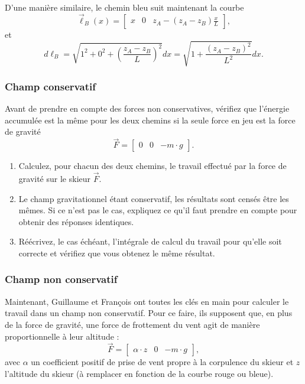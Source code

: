 \documentclass{cup-pan}
\begin{document}
D'une manière similaire, le chemin bleu suit maintenant la courbe
\begin{equation}
    \vec{\ell}_B(x) = \begin{bmatrix}x & 0 & z_A - (z_A - z_B)\frac{x}{L}\end{bmatrix},
\end{equation}
et
\begin{equation}
    d\ell_B = \sqrt{1^2 + 0^2 + (\frac{z_A - z_B}{L})^2} dx = \sqrt{1 + \frac{(z_A - z_B)^2}{L^2}} dx.
\end{equation}

\subsubsection{Champ conservatif}

Avant de prendre en compte des forces non conservatives, vérifiez que l'énergie accumulée est la même pour les deux chemins si la seule force en jeu est la force de gravité
\begin{equation}
\vec{F} = \begin{bmatrix} 0 & 0 &-m\cdot g\end{bmatrix}.
\end{equation}

\questions
\begin{enumerate}
    \item Calculez, pour chacun des deux chemins, le travail effectué par la force de gravité sur le skieur $\vec{F}$.
    \item Le champ gravitationnel étant conservatif, les résultats sont censés être les mêmes. Si ce n'est pas le cas, expliquez ce qu'il faut prendre en compte pour obtenir des réponses identiques.
    \item Réécrivez, le cas échéant, l'intégrale de calcul du travail pour qu'elle soit correcte et vérifiez que vous obtenez le même résultat.
\end{enumerate}

\vspace{\baselineskip}


\subsubsection{Champ non conservatif}

Maintenant, Guillaume et François ont toutes les clés en main pour calculer le travail dans un champ non conservatif. Pour ce faire, ils supposent que, en plus de la force de gravité, une force de frottement du vent agit de manière proportionnelle à leur altitude :
\begin{equation}
     \vec{F} = \begin{bmatrix} \alpha \cdot z & 0 &-m\cdot g \end{bmatrix},
\end{equation}
avec $\alpha$ un coefficient positif de prise de vent propre à la corpulence du skieur et $z$ l'altitude du skieur (à remplacer en fonction de la courbe rouge ou bleue).
\end{document}
